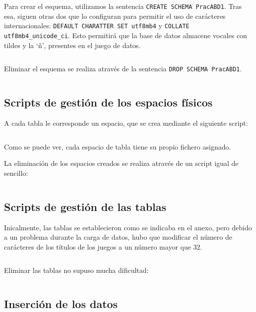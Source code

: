 \documentclass[a4paper, 11pt, oneside]{article} %
\newcommand{\scriptdir}{../scripts/} %
\begin{document}
Para crear el esquema, utilizamos la sentencia \texttt{CREATE SCHEMA PracABD1}. Tras esa, siguen otras dos que lo configuran para permitir el uso de carácteres internacionales: \texttt{DEFAULT CHARATTER SET utf8mb4} y \texttt{COLLATE utf8mb4_unicode_ci}. Esto permitirá que la base de datos almacene vocales con tildes y la `ñ', presentes en el juego de datos.\\

\inputminted{mysql}{\scriptdir creator.sql}

Eliminar el esquema se realiza através de la sentencia \texttt{DROP SCHEMA PracABD1}.\\

\inputminted{mysql}{\scriptdir dropper.sql}




\subsection{Scripts de gestión de los espacios físicos}

A cada tabla le corresponde un espacio, que se crea mediante el siguiente script:

\inputminted{mysql}{\scriptdir set_physical.sql}

Como se puede ver, cada espacio de tabla tiene su propio fichero asignado.

La eliminación de los espacios creados se realiza através de un script igual de sencillo:

\inputminted{mysql}{\scriptdir drop_physical.sql}




\subsection{Scripts de gestión de las tablas}

Inicalmente, las tablas se establecieron como se indicaba en el anexo, pero debido a un problema durante la carga de datos, hubo que modificar el número de carácteres de los títulos de los juegos a un número mayor que 32.

\inputminted{mysql}{\scriptdir set_tables.sql}

Eliminar las tablas no supuso mucha dificultad:

\inputminted{mysql}{\scriptdir drop_tables.sql}




\subsection{Inserción de los datos}
\end{document}
